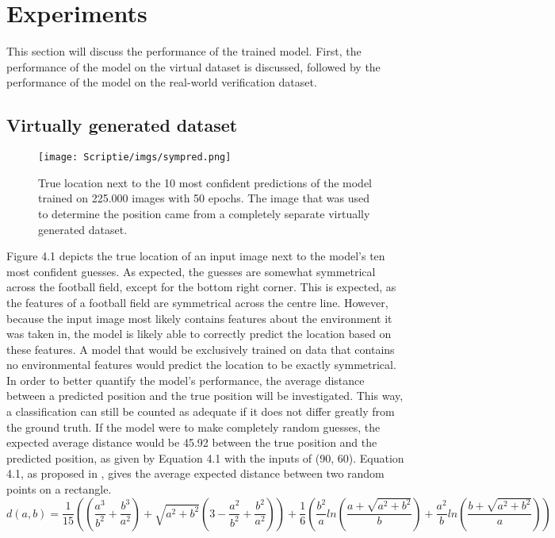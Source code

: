 \documentclass{uva-inf-bachelor-thesis}
\begin{document}
\chapter{Experiments}
    This section will discuss the performance of the trained model. First, the performance of the model on the virtual dataset is discussed, followed by the performance of the model on the real-world verification dataset.
    \section{Virtually generated dataset}
        \begin{figure}[H]
        \centering
        \texttt{[image: Scriptie/imgs/sympred.png]}
        \caption{True location next to the 10 most confident predictions of the model trained on 225.000 images with 50 epochs. The image that was used to determine the position came from a completely separate virtually generated dataset.}
        \end{figure}

    Figure 4.1 depicts the true location of an input image next to the model's ten most confident guesses. As expected, the guesses are somewhat symmetrical across the football field, except for the bottom right corner. This is expected, as the features of a football field are symmetrical across the centre line. However, because the input image most likely contains features about the environment it was taken in, the model is likely able to correctly predict the location based on these features. A model that would be exclusively trained on data that contains no environmental features would predict the location to be exactly symmetrical. 
    \hfill \break \\
    In order to better quantify the model's performance, the average distance between a predicted position and the true position will be investigated. This way, a classification can still be counted as adequate if it does not differ greatly from the ground truth. If the model were to make completely random guesses, the expected average distance would be 45.92 between the true position and the predicted position, as given by Equation 4.1 with the inputs of (90, 60). Equation 4.1, as proposed in \cite{avgdistance}, gives the average expected distance between two random points on a rectangle. 
    \begin{equation}
    d(a, b) = \frac{1}{15} \left(\left( \frac{a^3}{b^2} + \frac{b^3}{a^2}\right) + \sqrt{a^2 + b^2} \left(3 - \frac{a^2}{b^2} + \frac{b^2}{a^2}\right)\right) + \frac{1}{6}\left(\frac{b^2}{a} ln\left(\frac{a + \sqrt{a^2 + b^2}}{b}\right) + \frac{a^2}{b}ln\left(\frac{b + \sqrt{a^2 + b^2}}{a}\right)\right)
    \end{equation}
\end{document}

